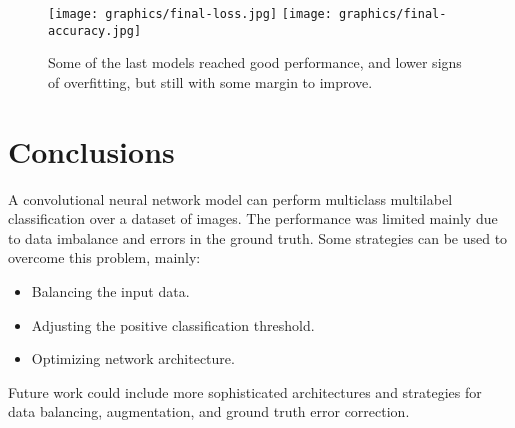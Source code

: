 \documentclass{article}
\begin{document}
\begin{figure}[ht]
  \centering
  \texttt{[image: graphics/final-loss.jpg]}
  \texttt{[image: graphics/final-accuracy.jpg]}
  \caption{Some of the last models reached good performance, and lower signs of overfitting, but still with some margin to improve.}
\end{figure}

\section{Conclusions}
A convolutional neural network model can perform multiclass multilabel classification over a dataset of images.
The performance was limited mainly due to data imbalance and errors in the ground truth.
Some strategies can be used to overcome this problem, mainly:

\begin{itemize}
  \item Balancing the input data.
  \item Adjusting the positive classification threshold.
  \item Optimizing network architecture.
\end{itemize}

Future work could include more sophisticated architectures and strategies for data balancing, augmentation, and ground truth error correction.
\end{document}
